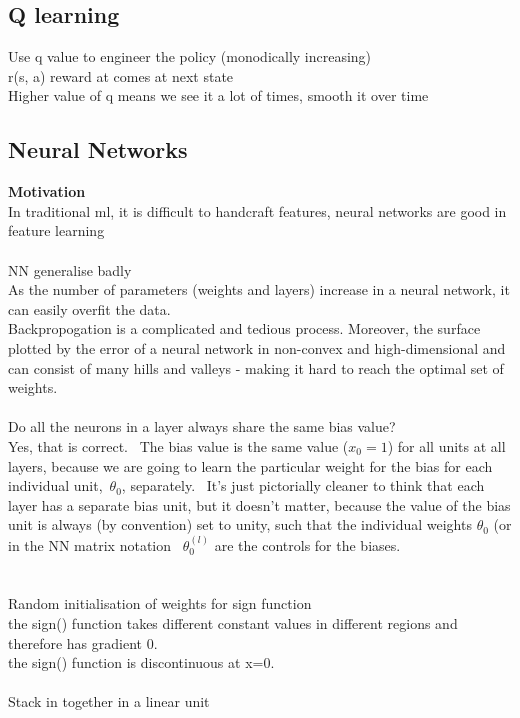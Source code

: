 \documentclass[11pt]{article}
\begin{document}
\subsection*{Q learning}
Use q value to engineer the policy (monodically increasing)\\
r(s, a) reward at comes at next state\\
Higher value of q means we see it a lot of times, smooth it over time
\newpage\noindent
\subsection*{Neural Networks}
\textbf{Motivation}\\
In traditional ml, it is difficult to handcraft features, neural networks are good in feature learning\\\\
NN generalise badly\\
As the number of parameters (weights and layers) increase in a neural network, it can easily overfit the data.\\
Backpropogation is a complicated and tedious process. Moreover, the surface plotted by the error of a neural network in non-convex and high-dimensional and can consist of many hills and valleys - making it hard to reach the optimal set of weights.\\
\\
Do all the neurons in a layer always share the same bias value?
\\
Yes, that is correct.  The bias value is the same value ($x_0=1$) for all units at all layers, because we are going to learn the particular weight for the bias for each individual unit, $\theta_{0}$, separately.  It's just pictorially cleaner to think that each layer has a separate bias unit, but it doesn't matter, because the value of the bias unit is always (by convention) set to unity, such that the individual weights $\theta_{0}$ (or in the NN matrix notation  $\theta^{(l)}_0$ are the controls for the biases. \\\\
\\
Random initialisation of weights for sign function\\
the sign() function takes different constant values in different regions and therefore has gradient 0.\\
the sign() function is discontinuous at x=0.\\
\\
Stack in together in a linear unit\\
\end{document}

